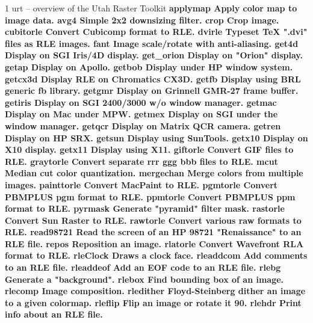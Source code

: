 %
%
%
 1
urt -- overview of the Utah Raster Toolkit
%
\bf applymap %
\rm Apply color map to image data.
\nwl
%
\bf avg4 %
\rm Simple 2x2 downsizing filter.
\nwl
%
\bf crop %
\rm Crop image.
\nwl
%
\bf cubitorle %
\rm Convert Cubicomp format to RLE.
\nwl
%
\bf dvirle %
\rm Typeset TeX ".dvi" files as RLE images.
\nwl
%
\bf fant %
\rm Image scale/rotate with anti-aliasing.
\nwl
%
\bf get4d %
\rm Display on SGI Iris/4D display.
\nwl
%
\bf get\_orion %
\rm Display on "Orion" display.
\nwl
%
\bf getap %
\rm Display on Apollo.
\nwl
%
\bf getbob %
\rm Display under HP window system.
\nwl
%
\bf getcx3d %
\rm Display RLE on Chromatics CX3D.
\nwl
%
\bf getfb %
\rm Display using BRL generic fb library.
\nwl
%
\bf getgmr %
\rm Display on Grinnell GMR-27 frame buffer.
\nwl
%
\bf getiris %
\rm Display on SGI 2400/3000 w/o window manager.
\nwl
%
\bf getmac %
\rm Display on Mac under MPW.
\nwl
%
\bf getmex %
\rm Display on SGI under the window manager.
\nwl
%
\bf getqcr %
\rm Display on Matrix QCR camera.
\nwl
%
\bf getren %
\rm Display on HP SRX.
\nwl
%
\bf getsun %
\rm Display using SunTools.
\nwl
%
\bf getx10 %
\rm Display on X10 display.
\nwl
%
\bf getx11 %
\rm Display using X11.
\nwl
%
\bf giftorle %
\rm Convert GIF files to RLE.
\nwl
%
\bf graytorle %
\rm Convert separate rrr ggg bbb files to RLE.
\nwl
%
\bf mcut %
\rm Median cut color quantization.
\nwl
%
\bf mergechan %
\rm Merge colors from multiple images.
\nwl
%
\bf painttorle %
\rm Convert MacPaint to RLE.
\nwl
%
\bf pgmtorle %
\rm Convert PBMPLUS pgm format to RLE.
\nwl
%
\bf ppmtorle %
\rm Convert PBMPLUS ppm format to RLE.
\nwl
%
\bf pyrmask %
\rm Generate "pyramid" filter mask.
\nwl
%
\bf rastorle %
\rm Convert Sun Raster to RLE.
\nwl
%
\bf rawtorle %
\rm Convert various raw formats to RLE.
\nwl
%
\bf read98721 %
\rm Read the screen of an HP 98721 "Renaissance" to an RLE file.
\nwl
%
\bf repos %
\rm Reposition an image.
\nwl
%
\bf rlatorle %
\rm Convert Wavefront RLA format to RLE.
\nwl
%
\bf rleClock %
\rm Draws a clock face.
\nwl
%
\bf rleaddcom %
\rm Add comments to an RLE file.
\nwl
%
\bf rleaddeof %
\rm Add an EOF code to an RLE file.
\nwl
%
\bf rlebg %
\rm Generate a "background".
\nwl
%
\bf rlebox %
\rm Find bounding box of an image.
\nwl
%
\bf rlecomp %
\rm Image composition.
\nwl
%
\bf rledither %
\rm Floyd-Steinberg dither an image to a given colormap.
\nwl
%
\bf rleflip %
\rm Flip an image or rotate it 90.
\nwl
%
\bf rlehdr %
\rm Print info about an RLE file.
